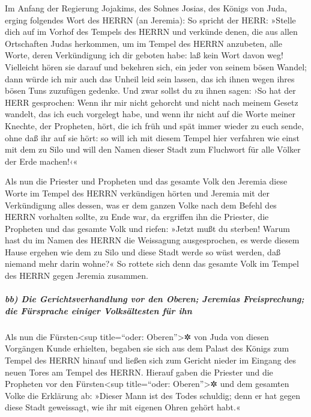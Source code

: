 Im Anfang der Regierung Jojakims, des Sohnes Josias, des
Königs von Juda, erging folgendes Wort des HERRN (an Jeremia):
So spricht der HERR: »Stelle dich auf im Vorhof des
Tempels des HERRN und verkünde denen, die aus allen Ortschaften Judas
herkommen, um im Tempel des HERRN anzubeten, alle Worte, deren
Verkündigung ich dir geboten habe: laß kein Wort davon weg!
Vielleicht hören sie darauf und bekehren sich, ein jeder
von seinem bösen Wandel; dann würde ich mir auch das Unheil leid sein
lassen, das ich ihnen wegen ihres bösen Tuns zuzufügen gedenke.
Und zwar sollst du zu ihnen sagen: ›So hat der HERR
gesprochen: Wenn ihr mir nicht gehorcht und nicht nach meinem Gesetz
wandelt, das ich euch vorgelegt habe, und wenn ihr nicht
auf die Worte meiner Knechte, der Propheten, hört, die ich früh und spät
immer wieder zu euch sende, ohne daß ihr auf sie hört: so
will ich mit diesem Tempel hier verfahren wie einst mit dem zu Silo und
will den Namen dieser Stadt zum Fluchwort für alle Völker der Erde
machen!‹«

Als nun die Priester und Propheten und das gesamte Volk
den Jeremia diese Worte im Tempel des HERRN verkündigen hörten
und Jeremia mit der Verkündigung alles dessen, was er dem
ganzen Volke nach dem Befehl des HERRN vorhalten sollte, zu Ende war, da
ergriffen ihn die Priester, die Propheten und das gesamte Volk und
riefen: »Jetzt mußt du sterben! Warum hast du im Namen des
HERRN die Weissagung ausgesprochen, es werde diesem Hause ergehen wie
dem zu Silo und diese Stadt werde so wüst werden, daß niemand mehr darin
wohne?« So rottete sich denn das gesamte Volk im Tempel des HERRN gegen
Jeremia zusammen.

\hypertarget{bb-die-gerichtsverhandlung-vor-den-oberen-jeremias-freisprechung-die-fuxfcrsprache-einiger-volksuxe4ltesten-fuxfcr-ihn}{%
\subparagraph{bb) Die Gerichtsverhandlung vor den Oberen; Jeremias
Freisprechung; die Fürsprache einiger Volksältesten für
ihn}\label{bb-die-gerichtsverhandlung-vor-den-oberen-jeremias-freisprechung-die-fuxfcrsprache-einiger-volksuxe4ltesten-fuxfcr-ihn}}

Als nun die Fürsten\textless sup title=``oder:
Oberen''\textgreater✲ von Juda von diesen Vorgängen Kunde erhielten,
begaben sie sich aus dem Palast des Königs zum Tempel des HERRN hinauf
und ließen sich zum Gericht nieder im Eingang des neuen Tores am Tempel
des HERRN. Hierauf gaben die Priester und die Propheten
vor den Fürsten\textless sup title=``oder: Oberen''\textgreater✲ und dem
gesamten Volke die Erklärung ab: »Dieser Mann ist des Todes schuldig;
denn er hat gegen diese Stadt geweissagt, wie ihr mit eigenen Ohren
gehört habt.«

